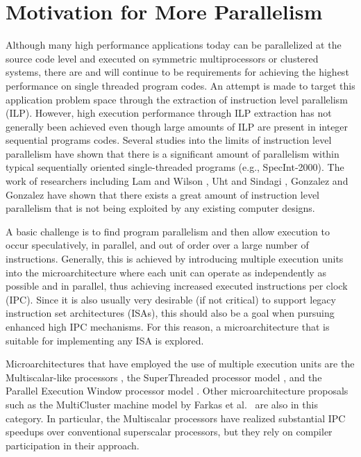 \documentclass{book}
\begin{document}
\section{Motivation for More Parallelism}
%
Although many high performance applications today
can be parallelized at the source code level 
and executed on symmetric multiprocessors or clustered systems,
there are and will continue
to be requirements for achieving the highest performance
on single threaded program codes.
An attempt is made to target this application problem space
through the extraction of instruction level parallelism (ILP).
However, 
high execution performance through ILP
extraction has not generally been achieved even though
large amounts of ILP are present in integer sequential programs
codes.
Several studies into the limits of instruction level 
parallelism have shown that there is 
a significant amount of parallelism within
typical sequentially oriented single-threaded programs
(e.g., SpecInt-2000).  
The work of researchers including 
Lam and Wilson \cite{Lam92},
Uht and Sindagi \cite{Uht95},
Gonzalez and Gonzalez \cite{Gon97}
have shown that there exists a great amount of instruction level
parallelism that is not being exploited by any existing
computer designs.

A basic challenge 
is to find program parallelism and then allow execution to occur
speculatively, in parallel, and out of order over 
a large number of instructions.
Generally, this is achieved by introducing multiple
execution units into the microarchitecture where each unit
can operate as independently as possible and in parallel, thus
achieving increased executed instructions per clock (IPC).
Since it is also usually very desirable (if not critical)
to support legacy instruction
set architectures (ISAs), this should also be a goal when pursuing 
enhanced high IPC mechanisms. 
For this reason, 
a microarchitecture that is suitable for implementing any ISA
is explored.

Microarchitectures that have employed the
use of multiple execution units are the Multiscalar-like
processors \cite{Sohi95,sundararaman97multiscalar},
the SuperThreaded processor model \cite{tsai96superthread},
and
the Parallel Execution Window processor model \cite{kemp96pew}.
Other microarchitecture proposals such as the MultiCluster machine
model by 
Farkas et al.~\cite{farkas97multicluster} are also in this category.
In particular, the Multiscalar processors have
realized substantial IPC speedups over conventional superscalar
processors, but they rely on compiler participation in their
approach.
\end{document}
